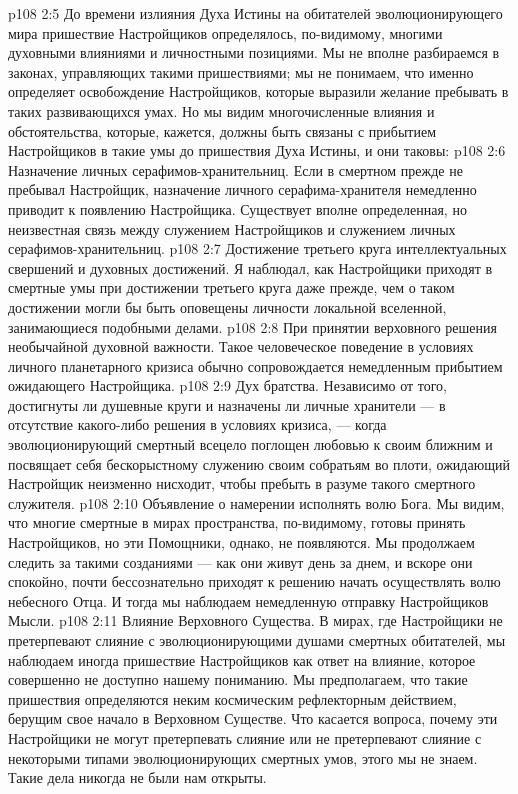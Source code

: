 \vs p108 2:5 До времени излияния Духа Истины на обитателей эволюционирующего мира пришествие Настройщиков определялось, по\hyp{}видимому, многими духовными влияниями и личностными позициями. Мы не вполне разбираемся в законах, управляющих такими пришествиями; мы не понимаем, что именно определяет освобождение Настройщиков, которые выразили желание пребывать в таких развивающихся умах. Но мы видим многочисленные влияния и обстоятельства, которые, кажется, должны быть связаны с прибытием Настройщиков в такие умы до пришествия Духа Истины, и они таковы:
\vs p108 2:6 \bibnobreakspace Назначение личных серафимов\hyp{}хранительниц. Если в смертном прежде не пребывал Настройщик, назначение личного серафима\hyp{}хранителя немедленно приводит к появлению Настройщика. Существует вполне определенная, но неизвестная связь между служением Настройщиков и служением личных серафимов\hyp{}хранительниц.
\vs p108 2:7 \pc {}\bibnobreakspace Достижение третьего круга интеллектуальных свершений и духовных достижений. Я наблюдал, как Настройщики приходят в смертные умы при достижении третьего круга даже прежде, чем о таком достижении могли бы быть оповещены личности локальной вселенной, занимающиеся подобными делами.
\vs p108 2:8 \pc {}\bibnobreakspace При принятии верховного решения необычайной духовной важности. Такое человеческое поведение в условиях личного планетарного кризиса обычно сопровождается немедленным прибытием ожидающего Настройщика.
\vs p108 2:9 \pc {}\bibnobreakspace Дух братства. Независимо от того, достигнуты ли душевные круги и назначены ли личные хранители --- в отсутствие какого\hyp{}либо решения в условиях кризиса, --- когда эволюционирующий смертный всецело поглощен любовью к своим ближним и посвящает себя бескорыстному служению своим собратьям во плоти, ожидающий Настройщик неизменно нисходит, чтобы пребыть в разуме такого смертного служителя.
\vs p108 2:10 \pc {}\bibnobreakspace Объявление о намерении исполнять волю Бога. Мы видим, что многие смертные в мирах пространства, по\hyp{}видимому, готовы принять Настройщиков, но эти Помощники, однако, не появляются. Мы продолжаем следить за такими созданиями --- как они живут день за днем, и вскоре они спокойно, почти бессознательно приходят к решению начать осуществлять волю небесного Отца. И тогда мы наблюдаем немедленную отправку Настройщиков Мысли.
\vs p108 2:11 \pc {}\bibnobreakspace Влияние Верховного Существа. В мирах, где Настройщики не претерпевают слияние с эволюционирующими душами смертных обитателей, мы наблюдаем иногда пришествие Настройщиков как ответ на влияние, которое совершенно не доступно нашему пониманию. Мы предполагаем, что такие пришествия определяются неким космическим рефлекторным действием, берущим свое начало в Верховном Существе. Что касается вопроса, почему эти Настройщики не могут претерпевать слияние или не претерпевают слияние с некоторыми типами эволюционирующих смертных умов, этого мы не знаем. Такие дела никогда не были нам открыты.
